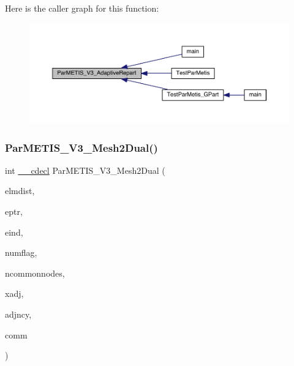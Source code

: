 Here is the caller graph for this function\+:\nopagebreak
\begin{figure}[H]
\begin{center}
\leavevmode
\includegraphics[width=350pt]{a00840_ac00c3da2cf618cbfa9158463a851491e_icgraph}
\end{center}
\end{figure}
\mbox{\label{a00840_a2f9e316d7e0c46037cf231cd82cf9d97}} 
\subsubsection{\texorpdfstring{Par\+M\+E\+T\+I\+S\+\_\+\+V3\+\_\+\+Mesh2\+Dual()}{ParMETIS\_V3\_Mesh2Dual()}}
{\footnotesize\ttfamily int \hyperlink{a00843_a238347d7669f8f1e9c83bfe63a2730c4}{\+\_\+\+\_\+cdecl} Par\+M\+E\+T\+I\+S\+\_\+\+V3\+\_\+\+Mesh2\+Dual (\begin{DoxyParamCaption}\item[{\hyperlink{a00876_aaa5262be3e700770163401acb0150f52}{idx\+\_\+t} $\ast$}]{elmdist,  }\item[{\hyperlink{a00876_aaa5262be3e700770163401acb0150f52}{idx\+\_\+t} $\ast$}]{eptr,  }\item[{\hyperlink{a00876_aaa5262be3e700770163401acb0150f52}{idx\+\_\+t} $\ast$}]{eind,  }\item[{\hyperlink{a00876_aaa5262be3e700770163401acb0150f52}{idx\+\_\+t} $\ast$}]{numflag,  }\item[{\hyperlink{a00876_aaa5262be3e700770163401acb0150f52}{idx\+\_\+t} $\ast$}]{ncommonnodes,  }\item[{\hyperlink{a00876_aaa5262be3e700770163401acb0150f52}{idx\+\_\+t} $\ast$$\ast$}]{xadj,  }\item[{\hyperlink{a00876_aaa5262be3e700770163401acb0150f52}{idx\+\_\+t} $\ast$$\ast$}]{adjncy,  }\item[{M\+P\+I\+\_\+\+Comm $\ast$}]{comm }\end{DoxyParamCaption})}

